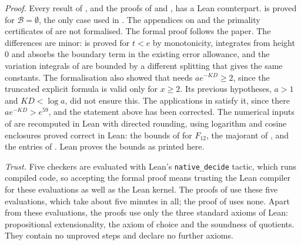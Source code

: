 \documentclass[11pt,colorlinks]{charlie}
\newcommand{\cB}{\mathcal B}
\begin{document}
\emph{Proof.} Every result of , and the proofs of  and , has a Lean counterpart.  is proved for $\cB=\emptyset$, the only case used in . The appendices on  and the primality certificates of  are not formalised. The formal proof follows the paper. The differences are minor:  is proved for $t<e$ by monotonicity,  integrates from height $0$ and absorbs the boundary term in the existing error allowance, and the variation integrals of  are bounded by a different splitting that gives the same constants. The formalisation also showed that  needs $ae^{-KD}\ge2$, since the truncated explicit formula is valid only for $x\ge2$. Its previous hypotheses, $a>1$ and $KD<\log a$, did not ensure this. The applications in  satisfy it, since there $ae^{-KD}>e^{59}$, and the statement above has been corrected. The numerical inputs of  are recomputed in Lean with directed rounding, using logarithm and cosine enclosures proved correct in Lean: the bounds of  for $F_{12}$, the majorant of , and the entries of . Lean proves the bounds as printed here.

\emph{Trust.} Five checkers are evaluated with Lean's \texttt{native\_decide} tactic, which runs compiled code, so accepting the formal proof means trusting the Lean compiler for these evaluations as well as the Lean kernel. The proofs of  use these five evaluations, which take about five minutes in all; the proof of  uses none. Apart from these evaluations, the proofs use only the three standard axioms of Lean: propositional extensionality, the axiom of choice and the soundness of quotients. They contain no unproved steps and declare no further axioms.
\end{document}
